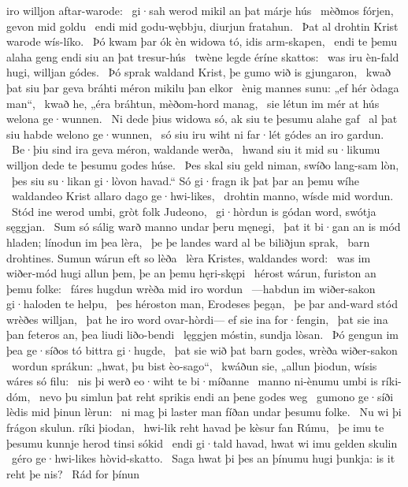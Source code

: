 iro willjon aftar-warode: \hld\ gi·sah werod mikil
an þat márje hús \hld\ mèðmos fórjen,
gevon mid goldu \hld\ endi mid godu-wębbju,
diurjun fratahun. \hld\ Þat al drohtin Krist
warode wís-líko. \hld\ Þó kwam þar ók èn widowa tó,
idis arm-skapen, \hld\ endi te þemu alaha geng
endi siu an þat tresur-hús \hld\ twène legde
éríne skattos: \hld\ was iru èn-fald hugi,
willjan gódes. \hld\ Þó sprak waldand Krist,
þe gumo wið is gjungaron, \hld\ kwað þat siu þar geva bráhti
méron mikilu þan elkor \hld\ ènig mannes sunu:
„ef hér òdaga man“, \hld\ kwað he, „éra bráhtun,
mèðom-hord manag, \hld\ sie létun im mér at hús
welona ge·wunnen. \hld\ Ni dede þius widowa só,
ak siu te þesumu alahe gaf \hld\ al þat siu habde
welono ge·wunnen, \hld\ só siu iru wiht ni far·lét
gódes an iro gardun. \hld\ Be·þiu sind ira geva méron,
waldande werða, \hld\ hwand siu it mid su·likumu willjon dede
te þesumu godes húse. \hld\ Þes skal siu geld niman,
swíðo lang-sam lòn, \hld\ þes siu su·likan gi·lòvon havad.“
Só gi·fragn ik þat þar an þemu wíhe \hld\ waldandeo Krist
allaro dago ge·hwi-likes, \hld\ drohtin manno,
wísde mid wordun. \hld\ Stód ine werod umbi,
gròt folk Judeono, \hld\ gi·hòrdun is gódan word,
swótja sęggjan. \hld\ Sum só sálig warð
manno undar þeru męnegi, \hld\ þat it bi·gan an is mód hladen;
línodun im þea lèra, \hld\ þe þe landes ward
al be biliðjun sprak, \hld\ barn drohtines.
Sumun wárun eft so lèða \hld\ lèra Kristes,
waldandes word: \hld\ was im wiðer-mód hugi
allun þem, þe an þemu hęri-skępi \hld\ hérost wárun,
furiston an þemu folke: \hld\ fáres hugdun
wrèða mid iro wordun \hld\ —habdun im wiðer-sakon
gi·haloden te helpu, \hld\ þes héroston man,
Erodeses þegạn, \hld\ þe þar and-ward stód
wrèðes willjan, \hld\ þat he iro word ovar-hòrdi—
ef sie ina for·fengin, \hld\ þat sie ina þan feteros an,
þea liudi liðo-bendi \hld\ lęggjen móstin,
sundja lòsan. \hld\ Þó gengun im þea ge·síðos tó
bittra gi·hugde, \hld\ þat sie wið þat barn godes,
wrèða wiðer-sakon \hld\ wordun sprákun:
„hwat, þu bist èo-sago“, \hld\ kwáðun sie, „allun þiodun,
wísis wáres só filu: \hld\ nis þi werð eo·wiht
te bi·míðanne \hld\ manno ni-ènumu
umbi is ríki-dóm, \hld\ nevo þu simlun þat reht sprikis
endi an þene godes weg \hld\ gumono ge·síði
lèdis mid þinun lèrun: \hld\ ni mag þi laster man
fíðan undar þesumu folke. \hld\ Nu wi þi frágon skulun.
ríki þiodan, \hld\ hwi-lik reht havad
þe kèsur fan Rúmu, \hld\ þe imu te þesumu kunnje herod
tinsi sókid \hld\ endi gi·tald havad,
hwat wi imu gelden skulin \hld\ géro ge·hwi-likes
hòvid-skatto. \hld\ Saga hwat þi þes an þínumu hugi þunkja:
is it reht þe nis? \hld\ Rád for þínun
